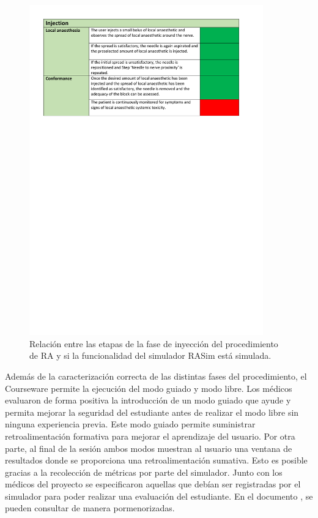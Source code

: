 \begin{figure}[ht]
    \centering
    \includegraphics[trim={1cm 19cm 1cm 1cm},clip,width=0.9\textwidth]{PDFs/RA3.pdf}
       \caption{Relación entre las etapas de la fase de inyección del procedimiento de \acs{RA} y si la funcionalidad del simulador \acs{RASim} está simulada.\label{fig:RAsteps3} }
    
\end{figure}



Además de la caracterización correcta de las distintas fases del procedimiento, el \ac{Courseware} permite la ejecución del modo guiado y modo libre. Los médicos evaluaron de forma positiva la introducción de un modo guiado que ayude y permita mejorar la seguridad del estudiante antes de realizar el modo libre sin ninguna experiencia previa. Este modo guiado permite suministrar retroalimentación formativa para mejorar el aprendizaje del usuario. Por otra parte, al final de la sesión ambos modos muestran al usuario una ventana de resultados donde se proporciona una retroalimentación sumativa. Esto es posible gracias a la recolección de métricas por parte del simulador. Junto con los médicos del proyecto se especificaron aquellas que debían ser registradas por el simulador para poder realizar una evaluación del estudiante. En el documento \cite{ded4.4}, se pueden consultar de manera pormenorizadas.


